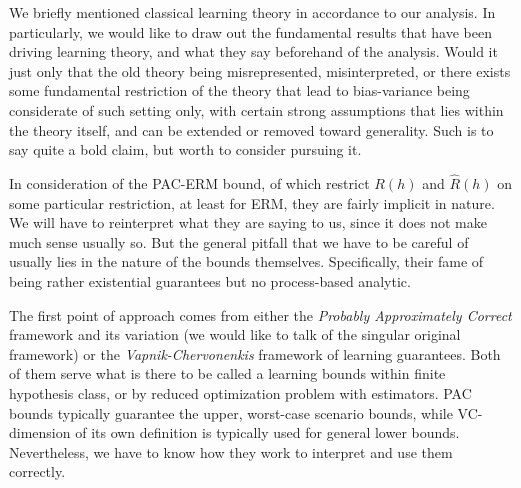 \documentclass[10pt]{article}
\begin{document}
We briefly mentioned classical learning theory in accordance to our analysis. In particularly, we would like to draw out the fundamental results that have been driving learning theory, and what they say beforehand of the analysis. Would it just only that the old theory being misrepresented, misinterpreted, or there exists some fundamental restriction of the theory that lead to bias-variance being considerate of such setting only, with certain strong assumptions that lies within the theory itself, and can be extended or removed toward generality. Such is to say quite a bold claim, but worth to consider pursuing it. 

In consideration of the PAC-ERM bound, of which restrict $R(h)$ and $\hat{R}(h)$ on some particular restriction, at least for ERM, they are fairly implicit in nature. We will have to reinterpret what they are saying to us, since it does not make much sense usually so. But the general pitfall that we have to be careful of usually lies in the nature of the bounds themselves. Specifically, their fame of being rather existential guarantees but no process-based analytic. 

The first point of approach comes from either the \textit{Probably Approximately Correct} framework and its variation (we would like to talk of the singular original framework) or the \textit{Vapnik-Chervonenkis} framework of learning guarantees. Both of them serve what is there to be called a learning bounds within finite hypothesis class, or by reduced optimization problem with estimators. PAC bounds typically guarantee the upper, worst-case scenario bounds, while VC-dimension of its own definition is typically used for general lower bounds. Nevertheless, we have to know how they work to interpret and use them correctly.
\end{document}
